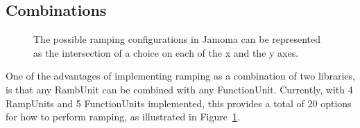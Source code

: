 \documentclass{article}
\begin{document}



\subsection{Combinations} %
\label{sec:combinations}

\begin{figure}
\centerline{}
\caption{The possible ramping configurations in Jamoma can be represented as the intersection of a choice on each of the x and the y axes.}
\label{fig:combinations}
\end{figure}
One of the advantages of implementing ramping as a combination of two libraries, is that any RambUnit can be combined with any FunctionUnit. Currently, with 4 RampUnits and 5 FunctionUnits implemented, this provides a total of 20 options for how to perform ramping, as illustrated in Figure~\ref{fig:combinations}.

\end{document}
